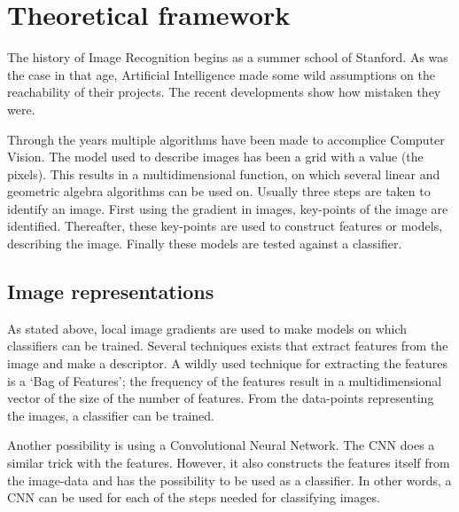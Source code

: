 \section{Theoretical framework}
\label{sec:Theory}
The history of Image Recognition begins as a summer school of Stanford.
As was the case in that age, Artificial Intelligence made some wild assumptions on the reachability of their projects. \citeneed
The recent developments show how mistaken they were.

Through the years multiple algorithms have been made to accomplice Computer Vision.
The model used to describe images has been a grid with a value (the pixels).
This results in a multidimensional function, on which several linear and geometric algebra algorithms can be used on.
Usually three steps are taken to identify an image.
First using the gradient in images, key-points of the image are identified.
Thereafter, these key-points are used to construct features or models, describing the image.
Finally these models are tested against a classifier. \citeneed


\subsection{Image representations}
\label{sec:Theory-image}
As stated above, local image gradients are used to make models on which classifiers can be trained.
Several techniques exists that extract features from the image and make a descriptor.
A wildly used technique for extracting the features is a `Bag of Features'; the frequency of the features result in a multidimensional vector of the size of the number of features.
From the data-points representing the images, a classifier can be trained. \citeneed

Another possibility is using a Convolutional Neural Network.
The CNN does a similar trick with the features.
However, it also constructs the features itself from the image-data and has the possibility to be used as a classifier.
In other words, a CNN can be used for each of the steps needed for classifying images.

